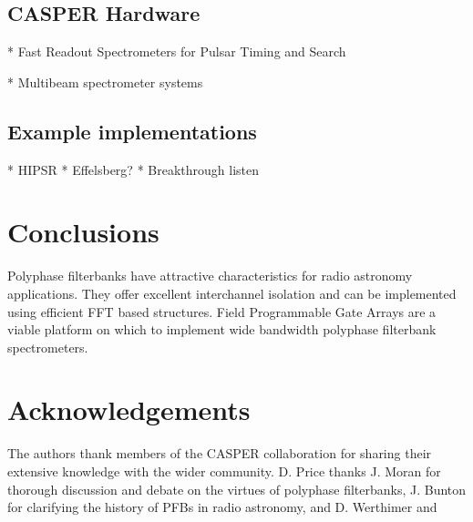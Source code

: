 \documentclass{ws-rv961x669}
\begin{document}
\subsection{CASPER Hardware}

* Fast Readout Spectrometers for Pulsar Timing and Search

* Multibeam spectrometer systems


\subsection{Example implementations}

* HIPSR
* Effelsberg?
* Breakthrough listen

\section{Conclusions}

Polyphase filterbanks have attractive characteristics for radio astronomy applications. They offer excellent interchannel isolation and can be implemented using efficient FFT based structures. Field Programmable Gate Arrays are a viable platform on which to implement wide bandwidth polyphase filterbank spectrometers.

\section{Acknowledgements}

The authors thank members of the CASPER collaboration for sharing their extensive knowledge with the wider community. D. Price thanks J. Moran for thorough discussion and debate on the virtues of polyphase filterbanks, J. Bunton for clarifying the history of PFBs in radio astronomy, and D. Werthimer and 



\end{document}
